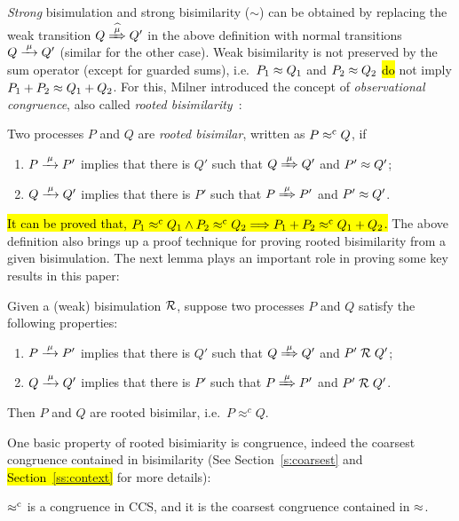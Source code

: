 \emph{Strong} bisimulation and strong bisimilarity ($\sim$)
can be obtained by replacing the weak transition $Q\Arcap\mu Q'$ in the above
definition with normal transitions $Q \arr \mu Q'$ (similar for the other case).
Weak bisimilarity is not preserved by the sum operator (except for
guarded sums), i.e.~$P_1 \approx Q_1$ and $P_2 \approx Q_2$  \hl{do} not imply
 $P_1 + P_2 \approx Q_1 + Q_2$.
For this, Milner introduced the concept of \emph{observational congruence}, also called \emph{rooted
  bisimilarity}~\cite{Gorrieri:2015jt,Sangiorgi:2011ut}:
\begin{definition}%
\label{d:rootedBisimilarity}
Two processes $P$ and $Q$ are \emph{rooted bisimilar}, written as $P
\mathrel{\approx^{\rm{c}}} Q$, if %
\begin{enumerate}
 \item  $P \arr\mu P'$ implies that there is $Q'$ such that $Q
   \Arr\mu Q'$ and $P' \approx Q'$;
 \item  $Q \arr\mu Q'$ implies that there is $P'$ such that $P
   \Arr\mu P'$ and $P' \approx Q'$\enspace.
\end{enumerate}
\end{definition}
\hl{It can be proved that, $P_1 \mathrel{\approx^{\rm{c}}} Q_1 \wedge P_2 \mathrel{\approx^{\rm{c}}} Q_2 \Longrightarrow
P_1 + P_2 \mathrel{\approx^{\rm{c}}} Q_1 + Q_2$.}
The above definition also brings up a proof technique for proving rooted
bisimilarity from a given bisimulation. The next
lemma plays an
important role in proving some key results in this paper:
\begin{lemma}
\label{l:obsCongrByWeakBisim}
Given a (weak) bisimulation $\mathrel{\cal R}$, suppose two processes $P$ and $Q$
satisfy the following properties:
\begin{enumerate}
\item $P \arr\mu P'$ implies that there is $Q'$ such that $Q
   \Arr\mu Q'$ and $P' \mathrel{\cal R} Q'$;
\item $Q \arr\mu Q'$ implies that there is $P'$ such that $P
   \Arr\mu P'$ and $P' \mathrel{\cal R} Q'$.
\end{enumerate}
Then $P$ and $Q$ are rooted bisimilar, i.e.~$P \approx^c Q$.
\end{lemma}

One basic property of rooted bisimiarity is congruence,
indeed the coarsest congruence contained in bisimilarity
(See Section~\ref{s:coarsest} and \hl{\mbox{Section~\ref{ss:context}}} for more details):
\begin{theorem}
\label{t:rapproxCongruence}
$\mathrel{\approx^{\rm{c}}}$ is a congruence in CCS, and it is the
coarsest congruence contained in $\approx$.
\end{theorem}

